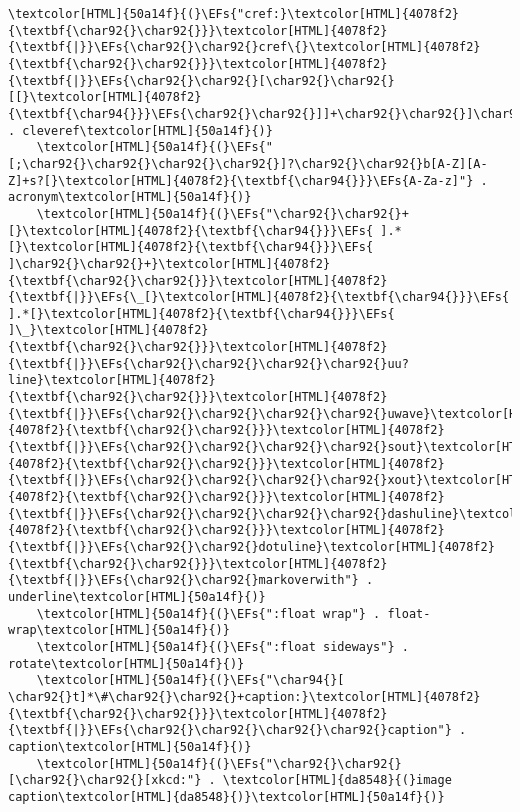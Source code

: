 \documentclass{scrartcl}
\newcommand{\EFs}[1]{\textcolor{EFs}{#1}} %
\begin{document}
\begin{enumerate}
\begin{Code}
\begin{Verbatim}[]
    \textcolor[HTML]{50a14f}{(}\EFs{"cref:}\textcolor[HTML]{4078f2}{\textbf{\char92{}\char92{}}}\textcolor[HTML]{4078f2}{\textbf{|}}\EFs{\char92{}\char92{}cref\{}\textcolor[HTML]{4078f2}{\textbf{\char92{}\char92{}}}\textcolor[HTML]{4078f2}{\textbf{|}}\EFs{\char92{}\char92{}[\char92{}\char92{}[[}\textcolor[HTML]{4078f2}{\textbf{\char94{}}}\EFs{\char92{}\char92{}]]+\char92{}\char92{}]\char92{}\char92{}]"} . cleveref\textcolor[HTML]{50a14f}{)}
    \textcolor[HTML]{50a14f}{(}\EFs{"[;\char92{}\char92{}\char92{}\char92{}]?\char92{}\char92{}b[A-Z][A-Z]+s?[}\textcolor[HTML]{4078f2}{\textbf{\char94{}}}\EFs{A-Za-z]"} . acronym\textcolor[HTML]{50a14f}{)}
    \textcolor[HTML]{50a14f}{(}\EFs{"\char92{}\char92{}+[}\textcolor[HTML]{4078f2}{\textbf{\char94{}}}\EFs{ ].*[}\textcolor[HTML]{4078f2}{\textbf{\char94{}}}\EFs{ ]\char92{}\char92{}+}\textcolor[HTML]{4078f2}{\textbf{\char92{}\char92{}}}\textcolor[HTML]{4078f2}{\textbf{|}}\EFs{\_[}\textcolor[HTML]{4078f2}{\textbf{\char94{}}}\EFs{ ].*[}\textcolor[HTML]{4078f2}{\textbf{\char94{}}}\EFs{ ]\_}\textcolor[HTML]{4078f2}{\textbf{\char92{}\char92{}}}\textcolor[HTML]{4078f2}{\textbf{|}}\EFs{\char92{}\char92{}\char92{}\char92{}uu?line}\textcolor[HTML]{4078f2}{\textbf{\char92{}\char92{}}}\textcolor[HTML]{4078f2}{\textbf{|}}\EFs{\char92{}\char92{}\char92{}\char92{}uwave}\textcolor[HTML]{4078f2}{\textbf{\char92{}\char92{}}}\textcolor[HTML]{4078f2}{\textbf{|}}\EFs{\char92{}\char92{}\char92{}\char92{}sout}\textcolor[HTML]{4078f2}{\textbf{\char92{}\char92{}}}\textcolor[HTML]{4078f2}{\textbf{|}}\EFs{\char92{}\char92{}\char92{}\char92{}xout}\textcolor[HTML]{4078f2}{\textbf{\char92{}\char92{}}}\textcolor[HTML]{4078f2}{\textbf{|}}\EFs{\char92{}\char92{}\char92{}\char92{}dashuline}\textcolor[HTML]{4078f2}{\textbf{\char92{}\char92{}}}\textcolor[HTML]{4078f2}{\textbf{|}}\EFs{\char92{}\char92{}dotuline}\textcolor[HTML]{4078f2}{\textbf{\char92{}\char92{}}}\textcolor[HTML]{4078f2}{\textbf{|}}\EFs{\char92{}\char92{}markoverwith"} . underline\textcolor[HTML]{50a14f}{)}
    \textcolor[HTML]{50a14f}{(}\EFs{":float wrap"} . float-wrap\textcolor[HTML]{50a14f}{)}
    \textcolor[HTML]{50a14f}{(}\EFs{":float sideways"} . rotate\textcolor[HTML]{50a14f}{)}
    \textcolor[HTML]{50a14f}{(}\EFs{"\char94{}[ \char92{}t]*\#\char92{}\char92{}+caption:}\textcolor[HTML]{4078f2}{\textbf{\char92{}\char92{}}}\textcolor[HTML]{4078f2}{\textbf{|}}\EFs{\char92{}\char92{}\char92{}\char92{}caption"} . caption\textcolor[HTML]{50a14f}{)}
    \textcolor[HTML]{50a14f}{(}\EFs{"\char92{}\char92{}[\char92{}\char92{}[xkcd:"} . \textcolor[HTML]{da8548}{(}image caption\textcolor[HTML]{da8548}{)}\textcolor[HTML]{50a14f}{)}

\end{Verbatim}
\end{Code}
\end{enumerate}
\end{document}

